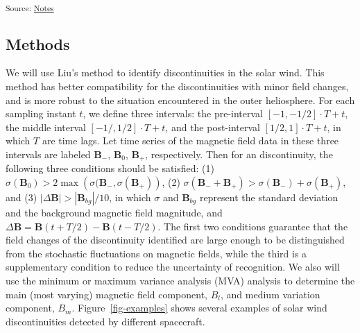 \documentclass[
]{agujournal2019}
\begin{document}
\textsubscript{Source: \href{https://Beforerr.github.io/ids_spatial_evolution_juno/notes.ipynb.html\#cell-tbl-missions}{Notes}}

\subsection{Methods}\label{methods}

We will use Liu's \citep{liu2022a} method to identify discontinuities in the solar wind. This method has better compatibility for the discontinuities with minor field changes, and is more robust to the situation encountered in the outer heliosphere. For each sampling instant \(t\), we define three intervals: the pre-interval \([-1,-1/2]\cdot T+t\), the middle interval \([-1/,1/2]\cdot T+t\), and the post-interval \([1/2,1]\cdot T+t\), in which \(T\) are time lags. Let time series of the magnetic field data in these three intervals are labeled \({\mathbf B}_-\), \({\mathbf B}_0\), \({\mathbf B}_+\), respectively. Then for an discontinuity, the following three conditions should be satisfied: (1) \(\sigma({\mathbf B}_0)>2\max\left(\sigma({\mathbf B}_-, \sigma({\mathbf B}_+)\right)\), (2) \(\sigma\left({\mathbf B}_-+{\mathbf B}_+\right)>\sigma({\mathbf B}_-)+\sigma({\mathbf B}_+)\), and (3) \(|\Delta {\mathbf B}|>|{\mathbf B}_{bg}|/10\), in which \(\sigma\) and \({\mathbf B}_{bg}\) represent the standard deviation and the background magnetic field magnitude, and \(\Delta {\mathbf B}={\mathbf B}(t+T/2)-{\mathbf B}(t-T/2)\). The first two conditions guarantee that the field changes of the discontinuity identified are large enough to be distinguished from the stochastic fluctuations on magnetic fields, while the third is a supplementary condition to reduce the uncertainty of recognition. We also will use the minimum or maximum variance analysis (MVA) analysis \citep{sonnerupMinimumMaximumVariance1998, sonnerupMagnetopauseStructureAttitude1967} to determine the main (most varying) magnetic field component, \(B_l\), and medium variation component, \(B_m\). Figure~\ref{fig-examples} shows several examples of solar wind discontinuities detected by different spacecraft.
\end{document}
